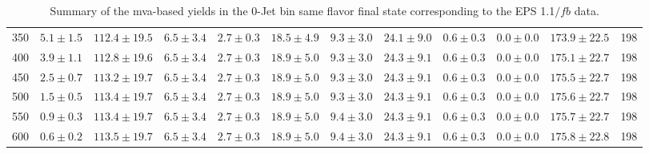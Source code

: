 \begin{table}
{\begin{center}
\begin{tabular}{l c c c c c c c c c c c }
350 & $5.1\pm1.5$ & $112.4\pm19.5$ & $6.5\pm3.4$ & $2.7\pm0.3$ & $18.5\pm4.9$ & $9.3\pm3.0$ & $24.1\pm9.0$ & $0.6\pm0.3$ & $0.0\pm0.0$ & $173.9\pm22.5$ & 198 \\
400 & $3.9\pm1.1$ & $112.8\pm19.6$ & $6.5\pm3.4$ & $2.7\pm0.3$ & $18.9\pm5.0$ & $9.3\pm3.0$ & $24.3\pm9.1$ & $0.6\pm0.3$ & $0.0\pm0.0$ & $175.1\pm22.7$ & 198 \\
450 & $2.5\pm0.7$ & $113.2\pm19.7$ & $6.5\pm3.4$ & $2.7\pm0.3$ & $18.9\pm5.0$ & $9.3\pm3.0$ & $24.3\pm9.1$ & $0.6\pm0.3$ & $0.0\pm0.0$ & $175.5\pm22.7$ & 198 \\
500 & $1.5\pm0.5$ & $113.4\pm19.7$ & $6.5\pm3.4$ & $2.7\pm0.3$ & $18.9\pm5.0$ & $9.3\pm3.0$ & $24.3\pm9.1$ & $0.6\pm0.3$ & $0.0\pm0.0$ & $175.6\pm22.7$ & 198 \\
550 & $0.9\pm0.3$ & $113.4\pm19.7$ & $6.5\pm3.4$ & $2.7\pm0.3$ & $18.9\pm5.0$ & $9.4\pm3.0$ & $24.3\pm9.1$ & $0.6\pm0.3$ & $0.0\pm0.0$ & $175.7\pm22.7$ & 198 \\
600 & $0.6\pm0.2$ & $113.5\pm19.7$ & $6.5\pm3.4$ & $2.7\pm0.3$ & $18.9\pm5.0$ & $9.4\pm3.0$ & $24.3\pm9.1$ & $0.6\pm0.3$ & $0.0\pm0.0$ & $175.8\pm22.8$ & 198 \\
\hline
\end{tabular}
\end{center}
}
\caption{Summary of the mva-based yields in the 0-Jet bin same flavor final state corresponding to the EPS 1.1$/fb$ data.}
\end{table}

